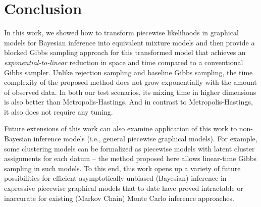 \section{Conclusion}
\label{sect:conclusion}

In this work, we showed how to transform piecewise likelihoods in
graphical models for Bayesian inference into equivalent mixture models
and then provide a blocked Gibbs sampling approach for this
transformed model that achieves an \emph{exponential-to-linear}
reduction in space and time compared to a conventional Gibbs sampler.
Unlike rejection sampling and baseline Gibbs sampling, the time
complexity of the proposed method does not grow exponentially with the
amount of observed data.  In both our test scenarios, its mixing time
in higher dimensions is also better than Metropolis-Hastings.
And in contrast to Metropolis-Hastings, it also does not require any tuning.  

Future extensions of this work can also examine application of this
work to non-Bayesian inference models (i.e., general piecewise
graphical models).  For example, some clustering models can be
formalized as piecewise models with latent cluster assignments for
each datum -- the method proposed here allows linear-time Gibbs
sampling in such models.  To this end, this work opens up a variety of
future possibilities for efficient asymptotically unbiased (Bayesian)
inference in expressive piecewise graphical models that to date have
proved intractable or inaccurate for existing (Markov Chain) Monte
Carlo inference approaches.

